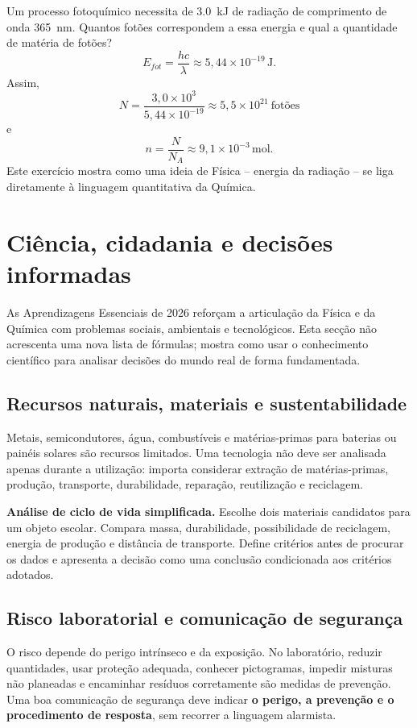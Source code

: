 \documentclass[11pt,a4paper,oneside]{book}
\begin{document}
\begin{exemplo}[title=Exemplo resolvido -- energia luminosa e quantidade de matéria]
Um processo fotoquímico necessita de \SI{3.0}{kJ} de radiação de comprimento de onda \SI{365}{nm}. Quantos fotões correspondem a essa energia e qual a quantidade de matéria de fotões?
\[
E_{fot}=\frac{hc}{\lambda}\approx5{,}44\times10^{-19}\,\mathrm{J}.
\]
Assim,
\[
N=\frac{3{,}0\times10^3}{5{,}44\times10^{-19}}\approx5{,}5\times10^{21}\ \text{fotões}
\]
e
\[
n=\frac{N}{N_A}\approx9{,}1\times10^{-3}\,\mathrm{mol}.
\]
Este exercício mostra como uma ideia de Física -- energia da radiação -- se liga diretamente à linguagem quantitativa da Química.
\end{exemplo}

\chapter{Ciência, cidadania e decisões informadas}

As Aprendizagens Essenciais de 2026 reforçam a articulação da Física e da Química com problemas sociais, ambientais e tecnológicos. Esta secção não acrescenta uma nova lista de fórmulas; mostra como usar o conhecimento científico para analisar decisões do mundo real de forma fundamentada.

\section{Recursos naturais, materiais e sustentabilidade}
Metais, semicondutores, água, combustíveis e matérias-primas para baterias ou painéis solares são recursos limitados. Uma tecnologia não deve ser analisada apenas durante a utilização: importa considerar extração de matérias-primas, produção, transporte, durabilidade, reparação, reutilização e reciclagem.

\begin{stem}
\textbf{Análise de ciclo de vida simplificada.} Escolhe dois materiais candidatos para um objeto escolar. Compara massa, durabilidade, possibilidade de reciclagem, energia de produção e distância de transporte. Define critérios antes de procurar os dados e apresenta a decisão como uma conclusão condicionada aos critérios adotados.
\end{stem}

\section{Risco laboratorial e comunicação de segurança}
O risco depende do perigo intrínseco e da exposição. No laboratório, reduzir quantidades, usar proteção adequada, conhecer pictogramas, impedir misturas não planeadas e encaminhar resíduos corretamente são medidas de prevenção. Uma boa comunicação de segurança deve indicar \textbf{o perigo, a prevenção e o procedimento de resposta}, sem recorrer a linguagem alarmista.
\end{document}
